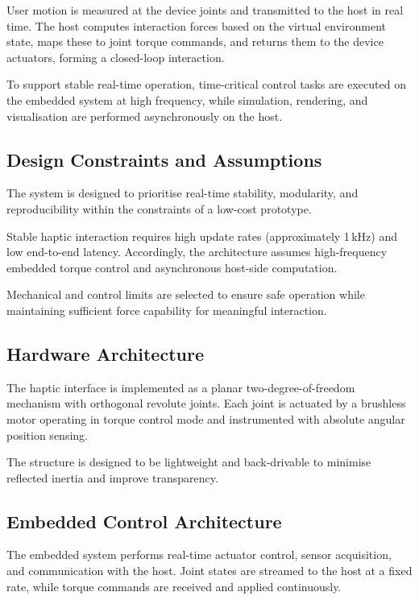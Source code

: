 User motion is measured at the device joints and transmitted to the host in real time. The host computes interaction forces based on the virtual environment state, maps these to joint torque commands, and returns them to the device actuators, forming a closed-loop interaction.

To support stable real-time operation, time-critical control tasks are executed on the embedded system at high frequency, while simulation, rendering, and visualisation are performed asynchronously on the host.

\subsection{Design Constraints and Assumptions}

The system is designed to prioritise real-time stability, modularity, and reproducibility within the constraints of a low-cost prototype.

Stable haptic interaction requires high update rates (approximately 1\,kHz) and low end-to-end latency. Accordingly, the architecture assumes high-frequency embedded torque control and asynchronous host-side computation.

Mechanical and control limits are selected to ensure safe operation while maintaining sufficient force capability for meaningful interaction.

\subsection{Hardware Architecture}

The haptic interface is implemented as a planar two-degree-of-freedom mechanism with orthogonal revolute joints. Each joint is actuated by a brushless motor operating in torque control mode and instrumented with absolute angular position sensing.

The structure is designed to be lightweight and back-drivable to minimise reflected inertia and improve transparency.

\subsection{Embedded Control Architecture}

The embedded system performs real-time actuator control, sensor acquisition, and communication with the host. Joint states are streamed to the host at a fixed rate, while torque commands are received and applied continuously.

